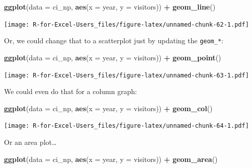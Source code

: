 \documentclass[]{book}
\newenvironment{Shaded}{\begin{snugshade}}{\end{snugshade}}
\newcommand{\DataTypeTok}[1]{\textcolor[rgb]{0.13,0.29,0.53}{#1}}
\newcommand{\KeywordTok}[1]{\textcolor[rgb]{0.13,0.29,0.53}{\textbf{#1}}}
\newcommand{\NormalTok}[1]{#1}
\newcommand{\OperatorTok}[1]{\textcolor[rgb]{0.81,0.36,0.00}{\textbf{#1}}}
\newcommand{\StringTok}[1]{\textcolor[rgb]{0.31,0.60,0.02}{#1}}
\begin{document}
\begin{Shaded}
\begin{Highlighting}[]
\KeywordTok{ggplot}\NormalTok{(}\DataTypeTok{data =}\NormalTok{ ci_np, }\KeywordTok{aes}\NormalTok{(}\DataTypeTok{x =}\NormalTok{ year, }\DataTypeTok{y =}\NormalTok{ visitors)) }\OperatorTok{+}
\StringTok{  }\KeywordTok{geom_line}\NormalTok{()}
\end{Highlighting}
\end{Shaded}

\texttt{[image: R-for-Excel-Users\_files/figure-latex/unnamed-chunk-62-1.pdf]}

Or, we could change that to a scatterplot just by updating the \texttt{geom\_*}:

\begin{Shaded}
\begin{Highlighting}[]
\KeywordTok{ggplot}\NormalTok{(}\DataTypeTok{data =}\NormalTok{ ci_np, }\KeywordTok{aes}\NormalTok{(}\DataTypeTok{x =}\NormalTok{ year, }\DataTypeTok{y =}\NormalTok{ visitors)) }\OperatorTok{+}
\StringTok{  }\KeywordTok{geom_point}\NormalTok{()}
\end{Highlighting}
\end{Shaded}

\texttt{[image: R-for-Excel-Users\_files/figure-latex/unnamed-chunk-63-1.pdf]}

We could even do that for a column graph:

\begin{Shaded}
\begin{Highlighting}[]
\KeywordTok{ggplot}\NormalTok{(}\DataTypeTok{data =}\NormalTok{ ci_np, }\KeywordTok{aes}\NormalTok{(}\DataTypeTok{x =}\NormalTok{ year, }\DataTypeTok{y =}\NormalTok{ visitors)) }\OperatorTok{+}
\StringTok{  }\KeywordTok{geom_col}\NormalTok{()}
\end{Highlighting}
\end{Shaded}

\texttt{[image: R-for-Excel-Users\_files/figure-latex/unnamed-chunk-64-1.pdf]}

Or an area plot\ldots{}

\begin{Shaded}
\begin{Highlighting}[]
\KeywordTok{ggplot}\NormalTok{(}\DataTypeTok{data =}\NormalTok{ ci_np, }\KeywordTok{aes}\NormalTok{(}\DataTypeTok{x =}\NormalTok{ year, }\DataTypeTok{y =}\NormalTok{ visitors)) }\OperatorTok{+}
\StringTok{  }\KeywordTok{geom_area}\NormalTok{()}
\end{Highlighting}
\end{Shaded}
\end{document}

